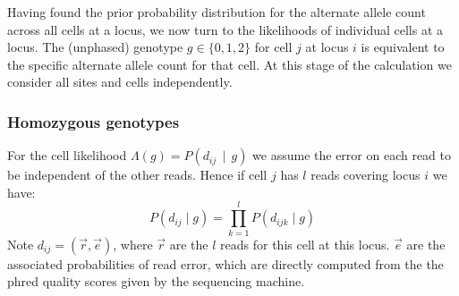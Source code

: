 \documentclass[../../main.tex]{subfiles}
\begin{document}

Having found the prior probability distribution for the alternate allele count across all cells at a locus, we now turn to the likelihoods of individual cells at a locus.
The (unphased) genotype $g\in\{0,1,2\}$ for cell $j$ at locus $i$ is equivalent to the specific alternate allele count for that cell.
At this stage of the calculation we consider all sites and cells independently.
\subsubsection*{Homozygous genotypes}
For the cell likelihood $\Lambda(g) = P(d_{ij}\,\mid\,g)$ we assume the error on each read to be independent of the other reads.
Hence if cell $j$ has $l$ reads covering locus $i$ we have:
\begin{equation}
    P(d_{ij}\mid g) = \prod_{k=1}^l P(d_{ijk} \mid g)
\end{equation}
Note $d_{ij}=(\vec{r},\vec{e})$, where $\vec{r}$ are the $l$ reads for this cell at this locus.
$\vec{e}$ are the associated probabilities of read error, which are directly computed from the the phred quality scores given by the sequencing machine.
\end{document}
